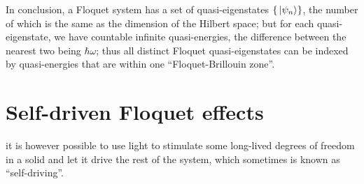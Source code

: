 \documentclass[hyperref, a4paper]{article}
\begin{document}
In conclusion, a Floquet system has a set of quasi-eigenstates $\{ \ket*{\psi_n} \}$,
the number of which is the same as 
the dimension of the Hilbert space;
but for each quasi-eigenstate,
we have countable infinite quasi-energies,
the difference between the nearest two being $\hbar \omega$;
thus all distinct Floquet quasi-eigenstates can be indexed 
by quasi-energies that are within one ``Floquet-Brillouin zone''.



\section{Self-driven Floquet effects}

it is however possible to use light to stimulate 
some long-lived degrees of freedom in a solid 
and let it drive the rest of the system, 
which sometimes is known as ``self-driving''.

\printbibliography
\end{document}
